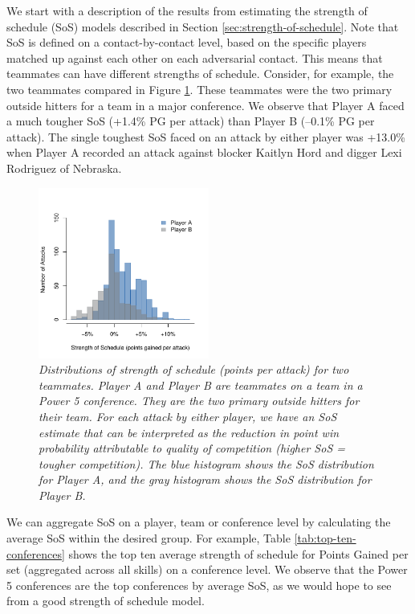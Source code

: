 \documentclass{article}
\begin{document}
We start with a description of the results from estimating the strength of schedule (SoS) models described in Section \ref{sec:strength-of-schedule}. Note that SoS is defined on a contact-by-contact level, based on the specific players matched up against each other on each adversarial contact. This means that teammates can have different strengths of schedule. Consider, for example, the two teammates compared in Figure \ref{fig:teammate-comparison}. These teammates were the two primary outside hitters for a team in a major conference. We observe that Player A faced a much tougher SoS (+1.4\% PG per attack) than Player B (--0.1\% PG per attack). The single toughest SoS faced on an attack by either player was +13.0\% when Player A recorded an attack against blocker Kaitlyn Hord and digger Lexi Rodriguez of Nebraska.

\begin{figure}
    \centering
    \includegraphics[width=0.5\textwidth]{figures/teammate_comparison.pdf}
    \caption{\it Distributions of strength of schedule (points per attack) for two teammates. Player A and Player B are teammates on a team in a Power 5 conference. They are the two primary outside hitters for their team. For each attack by either player, we have an SoS estimate that can be interpreted as the reduction in point win probability attributable to quality of competition (higher SoS = tougher competition). The blue histogram shows the SoS distribution for Player A, and the gray histogram shows the SoS distribution for Player B.}
    \label{fig:teammate-comparison}
\end{figure}

We can aggregate SoS on a player, team or conference level by calculating the average SoS within the desired group. For example, Table \ref{tab:top-ten-conferences} shows the top ten average strength of schedule for Points Gained per set (aggregated across all skills) on a conference level. We observe that the Power 5 conferences are the top conferences by average SoS, as we would hope to see from a good strength of schedule model.
\end{document}
